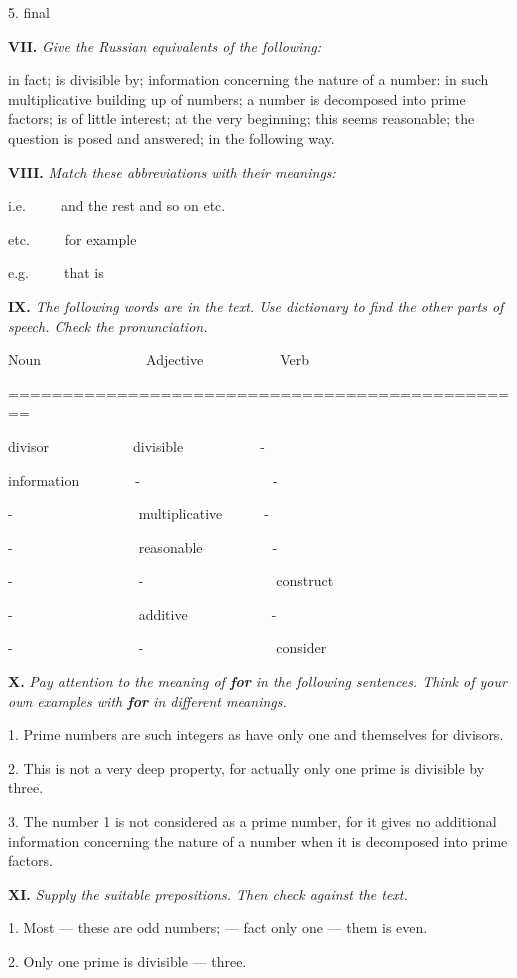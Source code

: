 \documentclass[a4paper]{article}
\newcommand{\ETask}[2]{\medskip\par\textbf{#1.} \textit{#2}\par}
\newcommand{\ETypeWr}[1]{\par\begin{ttfamily}#1\end{ttfamily}\par}
\begin{document}
5. final

\ETask{VII}{Give the Russian equivalents of the following:}
in fact; is divisible by; information concerning the nature of a number: in such multiplicative building up of numbers;
a number is decomposed into prime factors; is of little interest; at the very beginning; this seems reasonable; the question
is posed and answered; in the following way.

\ETask{VIII}{Match these abbreviations with their meanings:}

\ETypeWr{
i.e.~~~~~and the rest and so on etc.

etc.~~~~~for example

e.g.~~~~~that is}

\ETask{IX}{The following words are in the text. Use dictionary to find the
other parts of speech. Check the pronunciation.}
\ETypeWr{
Noun~~~~~~~~~~~~~~~Adjective~~~~~~~~~~~Verb

================================================

divisor~~~~~~~~~~~~divisible~~~~~~~~~~~-

information~~~~~~~~-~~~~~~~~~~~~~~~~~~~-

-~~~~~~~~~~~~~~~~~~multiplicative~~~~~~-

-~~~~~~~~~~~~~~~~~~reasonable~~~~~~~~~~-

-~~~~~~~~~~~~~~~~~~-~~~~~~~~~~~~~~~~~~~construct

-~~~~~~~~~~~~~~~~~~additive~~~~~~~~~~~~-

-~~~~~~~~~~~~~~~~~~-~~~~~~~~~~~~~~~~~~~consider}

\ETask{X}{Pay attention to the meaning of \textbf{for} in the following sentences. Think of your own examples with \textbf{for}
in different meanings.}

1. Prime numbers are such integers as have only one and themselves for divisors.

2. This is not a very deep property, for actually only one prime is divisible by three.

3. The number 1 is not considered as a prime number, for it gives no additional information concerning the nature of a number
when it is decomposed into prime factors.

\ETask{XI}{Supply the suitable prepositions. Then check against the text.}

1. Most --- these are odd numbers; --- fact only one --- them is even.

2. Only one prime is divisible --- three.
\end{document}
